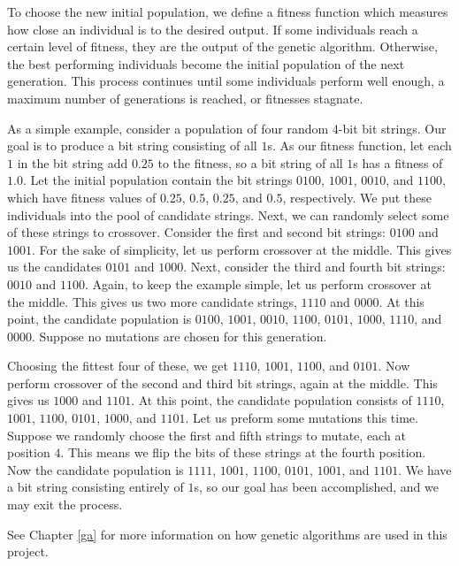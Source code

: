 To choose the new initial population, we define a fitness function which measures how close an individual is to the desired output.
If some individuals reach a certain level of fitness, they are the output of the genetic algorithm.
Otherwise, the best performing individuals become the initial population of the next generation.
This process continues until some individuals perform well enough, a maximum number of generations is reached, or fitnesses stagnate.

As a simple example, consider a population of four random 4-bit bit strings.
Our goal is to produce a bit string consisting of all $1$s.
As our fitness function, let each $1$ in the bit string add $0.25$ to the fitness, so a bit string of all $1$s has a fitness of $1.0$.
Let the initial population contain the bit strings $0100$, $1001$, $0010$, and $1100$, which have fitness values of $0.25$, $0.5$, $0.25$, and $0.5$, respectively.
We put these individuals into the pool of candidate strings.
Next, we can randomly select some of these strings to crossover.
Consider the first and second bit strings: $0100$ and $1001$.
For the sake of simplicity, let us perform crossover at the middle.
This gives us the candidates $0101$ and $1000$.
Next, consider the third and fourth bit strings: $0010$ and $1100$.
Again, to keep the example simple, let us perform crossover at the middle.
This gives us two more candidate strings, $1110$ and $0000$.
At this point, the candidate population is $0100$, $1001$, $0010$, $1100$, $0101$, $1000$, $1110$, and $0000$.
Suppose no mutations are chosen for this generation.

Choosing the fittest four of these, we get $1110$, $1001$, $1100$, and $0101$.
Now perform crossover of the second and third bit strings, again at the middle.
This gives us $1000$ and $1101$.
At this point, the candidate population consists of $1110$, $1001$, $1100$, $0101$, $1000$, and $1101$.
Let us preform some mutations this time.
Suppose we randomly choose the first and fifth strings to mutate, each at position $4$.
This means we flip the bits of these strings at the fourth position.
Now the candidate population is $1111$, $1001$, $1100$, $0101$, $1001$, and $1101$.
We have a bit string consisting entirely of $1$s, so our goal has been accomplished, and we may exit the process.

See Chapter \ref{ga} for more information on how genetic algorithms are used in this project.
